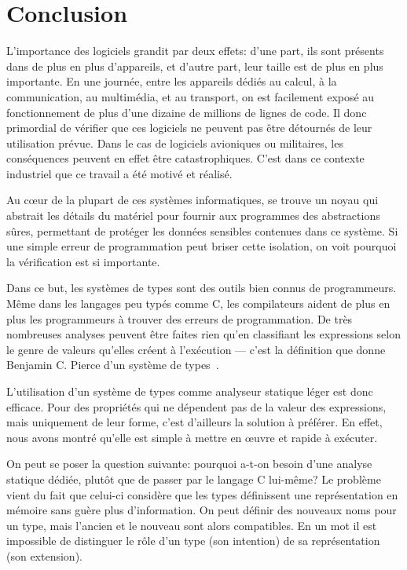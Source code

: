
\section*{Conclusion}

L'importance des logiciels grandit par deux effets: d'une part, ils sont
présents dans de plus en plus d'appareils, et d'autre part, leur taille est de
plus en plus importante. En une journée, entre les appareils dédiés au calcul, à
la communication, au multimédia, et au transport, on est facilement exposé au
fonctionnement de plus d'une dizaine de millions de lignes de code. Il donc
primordial de vérifier que ces logiciels ne peuvent pas être détournés de leur
utilisation prévue. Dans le cas de logiciels avioniques ou militaires, les
conséquences peuvent en effet être catastrophiques. C'est dans ce contexte
industriel que ce travail a été motivé et réalisé.

Au cœur de la plupart de ces systèmes informatiques, se trouve un noyau qui
abstrait les détails du matériel pour fournir aux programmes des abstractions
sûres, permettant de protéger les données sensibles contenues dans ce système.
Si une simple erreur de programmation peut briser cette isolation, on voit
pourquoi la vérification est si importante.

Dans ce but, les systèmes de types sont des outils bien connus de programmeurs.
Même dans les langages peu typés comme C, les compilateurs aident de plus en
plus les programmeurs à trouver des erreurs de programmation. De très nombreuses
analyses peuvent être faites rien qu'en classifiant les expressions selon le
genre de valeurs qu'elles créent à l'exécution --- c'est la définition que donne
Benjamin C. Pierce d'un système de types~\cite[p.~1]{TAPL}.

L'utilisation d'un système de types comme analyseur statique léger est donc
efficace. Pour des propriétés qui ne dépendent pas de la valeur des expressions,
mais uniquement de leur forme, c'est d'ailleurs la solution à préférer. En
effet, nous avons montré qu'elle est simple à mettre en œuvre et rapide à
exécuter.

On peut se poser la question suivante: pourquoi a-t-on besoin d'une analyse
statique dédiée, plutôt que de passer par le langage C lui-même? Le problème
vient du fait que celui-ci considère que les types définissent une
représentation en mémoire sans guère plus d'information. On peut définir des
nouveaux noms pour un type, mais l'ancien et le nouveau sont alors compatibles.
En un mot il est impossible de distinguer le rôle d'un type (son intention) de
sa représentation (son extension).

